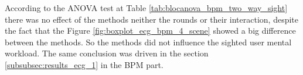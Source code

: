 %


According to the ANOVA test at Table \ref{tab:blocanova_bpm_two_way_sight} there was no effect of the methods neither the rounds or their interaction, despite the fact that the Figure \ref{fig:boxplot_ecg_bpm_4_scene} showed a big difference between the methods. So the methods did not influence the sighted user mental workload. The same conclusion was driven in the section \ref{subsubsec:results_ecg_1} in the BPM part.

\FloatBarrier
